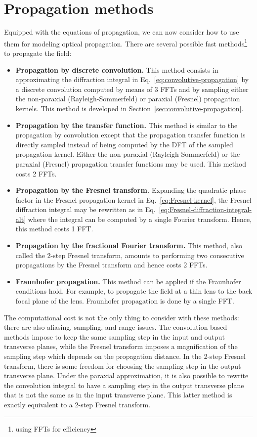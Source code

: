 \documentclass[a4paper]{article}
\begin{document}
\newpage
\section{Propagation methods}

Equipped with the equations of propagation, we can now consider how to use them
for modeling optical propagation. There are several possible fast
methods\footnote{using FFTs for efficiency} to propagate the field:
\begin{itemize}
\item \textbf{Propagation by discrete convolution.} This method consists in
      approximating the diffraction integral in
      Eq.~\eqref{eq:convolutive-propagation} by a discrete convolution computed
      by means of 3 FFTs and by sampling either the non-paraxial
      (Rayleigh-Sommerfeld) or paraxial (Fresnel) propagation kernels. This
      method is developed in Section~\ref{sec:convolutive-propagation}.
\item \textbf{Propagation by the transfer function.} This method is similar to
      the propagation by convolution except that the propagation transfer
      function is directly sampled instead of being computed by the DFT of the
      sampled propagation kernel. Either the non-paraxial (Rayleigh-Sommerfeld)
      or the paraxial (Fresnel) propagation transfer functions may be used.
      This method costs 2 FFTs.
\item \textbf{Propagation by the Fresnel transform.} Expanding the quadratic
      phase factor in the Fresnel propagation kernel in
      Eq.~\eqref{eq:Fresnel-kernel}, the Fresnel diffraction integral may be
      rewritten as in Eq.~\eqref{eq:Fresnel-diffraction-integral-alt} where the
      integral can be computed by a single Fourier transform. Hence, this
      method costs 1 FFT.
\item \textbf{Propagation by the fractional Fourier transform.} This method,
      also called the 2-step Fresnel transform, amounts to performing two
      consecutive propagations by the Fresnel transform and hence costs 2 FFTs.
\item \textbf{Fraunhofer propagation.} This method can be applied if the
      Fraunhofer conditions hold. For example, to propagate the field at a thin
      lens to the back focal plane of the lens. Fraunhofer propagation is done
      by a single FFT.
\end{itemize}
The computational cost is not the only thing to consider with these methods:
there are also aliasing, sampling, and range issues. The convolution-based
methods impose to keep the same sampling step in the input and output
transverse planes, while the Fresnel transform imposes a magnification of the
sampling step which depends on the propagation distance. In the 2-step Fresnel
transform, there is some freedom for choosing the sampling step in the output
transverse plane. Under the paraxial approximation, it is also possible to
rewrite the convolution integral to have a sampling step in the output
transverse plane that is not the same as in the input transverse plane. This
latter method is exactly equivalent to a 2-step Fresnel transform.
\end{document}

